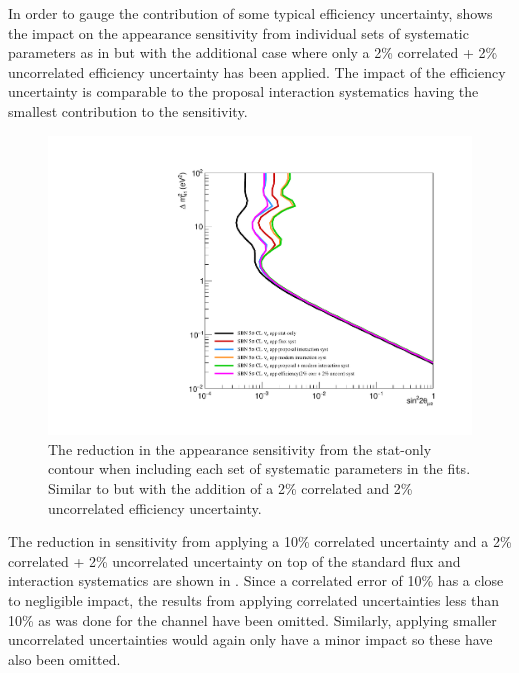 In order to gauge the contribution of some typical efficiency uncertainty,  shows the impact on the \nue appearance sensitivity from individual sets of systematic parameters as in  but with the additional case where only a 2\% correlated + 2\% uncorrelated efficiency uncertainty has been applied. The impact of the efficiency uncertainty is comparable to the proposal interaction systematics having the smallest contribution to the sensitivity. 

\begin{figure}[h!]
    \centering
    \includegraphics[width = \largefigwidth]{figures-chap6/exclusion_contours/nue_app_syst_groups+det.pdf}
    \caption[\nue app sensitivity reduction from different systematic groups with a (2+2)\% efficiency uncertainty.]{The reduction in the \nue appearance sensitivity from the stat-only contour when including each set of systematic parameters in the fits. Similar to  but with the addition of a 2\% correlated and 2\% uncorrelated efficiency uncertainty.}
    \label{fig:nue_app_syst_groups+efficiency}
\end{figure}

The reduction in sensitivity from applying a 10\% correlated uncertainty and a 2\% correlated + 2\% uncorrelated uncertainty on top of the standard flux and interaction systematics are shown in . Since a correlated error of 10\% has a close to negligible impact, the results from applying correlated uncertainties less than 10\% as was done for the \numu channel have been omitted. Similarly, applying smaller uncorrelated uncertainties would again only have a minor impact so these have also been omitted.  


